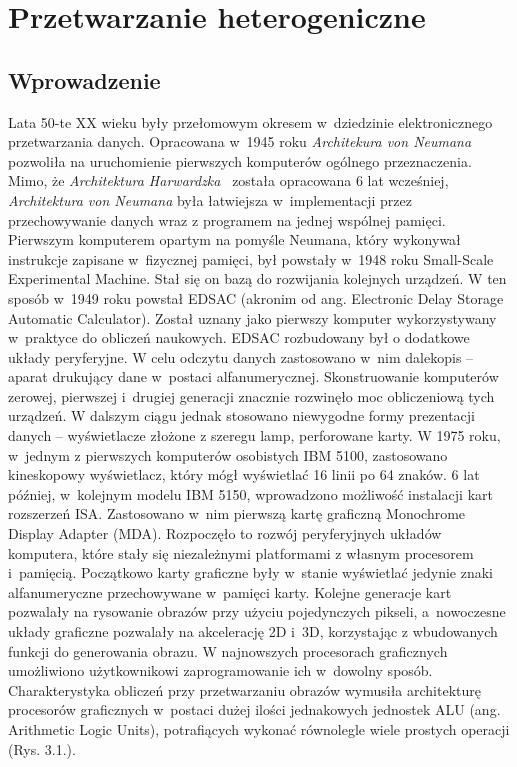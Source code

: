 \chapter{Przetwarzanie heterogeniczne}\label{cha:hpo}


\section{Wprowadzenie}\label{sec:wprowadzenie}


Lata 50-te XX wieku były przełomowym okresem w~dziedzinie elektronicznego przetwarzania danych. Opracowana w~1945 roku \emph{Architekura von Neumana}~\cite{b16} pozwoliła na uruchomienie pierwszych komputerów ogólnego przeznaczenia. Mimo, że \emph{Architektura Harwardzka}~\cite{b17} została opracowana 6 lat wcześniej, \emph{Architektura von Neumana} była łatwiejsza w~implementacji przez przechowywanie danych wraz z programem na jednej wspólnej pamięci. Pierwszym komputerem opartym na pomyśle Neumana, który wykonywał instrukcje zapisane w~fizycznej pamięci, był powstały w~1948 roku Small-Scale Experimental Machine. Stał się on bazą do rozwijania kolejnych urządzeń. W ten sposób w~1949 roku powstał EDSAC (akronim od ang. Electronic Delay Storage Automatic Calculator). Został uznany jako  pierwszy komputer wykorzystywany w~praktyce do obliczeń naukowych. EDSAC rozbudowany był o dodatkowe układy peryferyjne. W celu odczytu danych zastosowano w~nim dalekopis – aparat drukujący dane w~postaci alfanumerycznej. Skonstruowanie komputerów zerowej, pierwszej i~drugiej generacji znacznie rozwinęło moc obliczeniową tych urządzeń. W dalszym ciągu jednak stosowano niewygodne formy prezentacji danych – wyświetlacze złożone z szeregu lamp, perforowane karty. W 1975 roku, w~jednym z pierwszych komputerów osobistych IBM 5100, zastosowano kineskopowy wyświetlacz, który mógł wyświetlać 16 linii po 64 znaków. 6 lat później, w~kolejnym modelu IBM 5150, wprowadzono możliwość instalacji kart rozszerzeń ISA. Zastosowano w~nim pierwszą kartę graficzną Monochrome Display Adapter (MDA). Rozpoczęło to rozwój peryferyjnych układów komputera, które stały się niezależnymi platformami z własnym procesorem i~pamięcią. Początkowo karty graficzne były w~stanie wyświetlać jedynie znaki alfanumeryczne przechowywane w~pamięci karty. Kolejne generacje kart pozwalały na rysowanie obrazów przy użyciu pojedynczych pikseli, a~nowoczesne układy graficzne pozwalały na akcelerację 2D i~3D, korzystając z wbudowanych funkcji do generowania obrazu. W najnowszych procesorach graficznych umożliwiono użytkownikowi zaprogramowanie ich w~dowolny sposób. Charakterystyka obliczeń przy przetwarzaniu obrazów wymusiła architekturę procesorów graficznych w~postaci dużej ilości jednakowych jednostek ALU (ang. Arithmetic Logic Units), potrafiących wykonać równolegle wiele prostych operacji (Rys. 3.1.).
